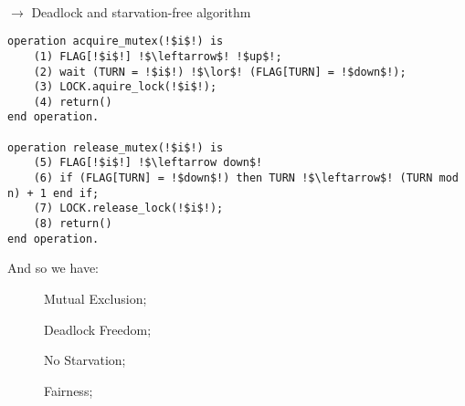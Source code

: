 \paragraph{} {\large $\rightarrow$ Deadlock and starvation-free algorithm}\\
\begin{minipage}{0.75\textwidth}
    \begin{tcolorbox}[colback=nightblue!5!white, colframe=nightblue!75!black]
        \begin{lstlisting}[label={lst:mutex2}, morekeywords={operation, repeat, until, is, if, then, else, end, procedure}, numbers=none, escapechar=!]
operation acquire_mutex(!$i$!) is
    (1) FLAG[!$i$!] !$\leftarrow$! !$up$!;
    (2) wait (TURN = !$i$!) !$\lor$! (FLAG[TURN] = !$down$!);
    (3) LOCK.aquire_lock(!$i$!);
    (4) return()
end operation.

operation release_mutex(!$i$!) is
    (5) FLAG[!$i$!] !$\leftarrow down$!
    (6) if (FLAG[TURN] = !$down$!) then TURN !$\leftarrow$! (TURN mod n) + 1 end if;
    (7) LOCK.release_lock(!$i$!);
    (8) return()
end operation.\end{lstlisting}
    \end{tcolorbox}
\end{minipage}
\hfill\vrule\hfill
\begin{minipage}{0.2\textwidth}
    \centering
    \par And so we have:
    \begin{description}
        \item[\cmark] Mutual Exclusion;
        \item[\cmark] Deadlock Freedom;
        \item[\cmark] No Starvation;
        \item[\xmark] Fairness;
    \end{description}
\end{minipage}
